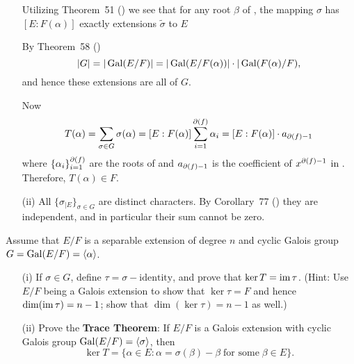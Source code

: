 \begin{myenumerate}
\begin{itemize}
    Utilizing Theorem~51 (\cite{Rotman98}) we see that
    for any root \(\beta\) of \fx, the mapping \(\sigma\)
    has \([E:F(\alpha)]\) exactly extensions \(\tilde\sigma\) to $E$

    By Theorem~58 (\cite{Rotman98})
    \begin{equation*}
     |G| = |\mathop{\rm Gal}\nolimits(E/F)| = |\mathop{\rm Gal}\nolimits(E/F(\alpha))| \cdot |\mathop{\rm Gal}\nolimits(F(\alpha)/F),
    \end{equation*}
    and hence these extensions are all of $G$.

    Now
    \begin{equation*}
      T(\alpha) = \sum_{\sigma\in G} \sigma(\alpha)
        = [E:F(\alpha)] \sum_{i=1}^{\partial(f)} \alpha_i
        = [E:F(\alpha)] \cdot a_{\partial(f)-1}
    \end{equation*}
    where \(\{\alpha_i\}_{i=1}^{\partial(f)}\) are the roots of \fx
    and \(a_{\partial(f)-1}\) is the coefficient of \(x^{\partial(f)-1}\) in \fx.
    Therefore, \(T(\alpha) \in F\).

 \item [(ii)]
    All \(\{\sigma_{|E}\}_{\sigma\in G}\) are distinct characters.
    By Corollary~77 (\cite{Rotman98}) they are independent, and in particular
    their sum cannot be zero.

\end{itemize}

\item
\begin{excopy}
Assume  \label{ex:96}
that \(E/F\) is a separable extension of degree $n$ and cyclic
Galois group \(G = \mathop{\rm Gal}\nolimits(E/F) = \langle \alpha \rangle\).
\begin{itemize}
 \item[(i)]
   If \(\sigma \in G\), define \(\tau = \sigma - \textrm{identity}\),
   and prove that \(\mathop{\rm ker}\nolimits T = \mathop{\rm im}\nolimits \tau\).
   (Hint: Use \(E/F\) being a Galois extension to show that
    \(\ker \tau = F\) and hence \(\mathop{\rm dim}\nolimits(\mathop{\rm im}\nolimits\tau) = n - 1\);
    show that \(\dim(\ker\tau) = n - 1\) as well.)
 \item[(ii)]
   Prove the
   \textbf{Trace Theorem}: If \(E/F\) is a Galois extension
   with cyclic Galois group \(\mathop{\rm Gal}\nolimits(E/F) = \langle \sigma \rangle\), then
   \begin{equation*}
    \ker T = \{\alpha \in E: \alpha = \sigma(\beta) - \beta\;
                             \textrm{for some}\; \beta \in E\}.
   \end{equation*}
\end{itemize}
\end{excopy}


\end{myenumerate}
